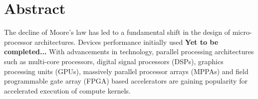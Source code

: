 \chapter*{Abstract} 
\label{ch0i_Abstract}

The decline of Moore's law has led to a fundamental shift in the design of micro-processor architectures. Devices performance initially used 
\textbf{Yet to be completed...}
With advancements in technology, parallel processing architectures such as multi-core processors, digital signal processors (DSPs), graphics processing units (GPUs), massively parallel processor arrays (MPPAs) and field programmable gate array (FPGA) based accelerators are gaining popularity for accelerated execution of compute kernels.
